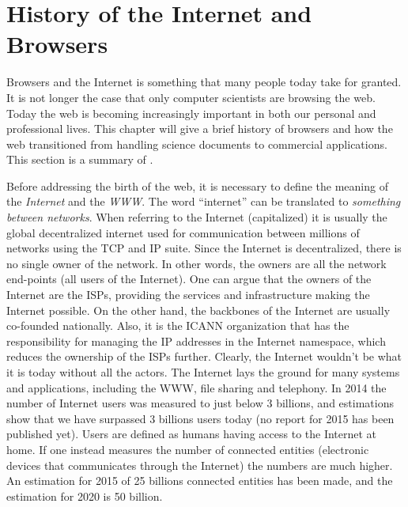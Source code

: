\chapter{History of the Internet and Browsers}
  Browsers and the Internet is something that many people today take for granted.
  It is not longer the case that only computer scientists are browsing the \gls{web}.
  Today the \gls{web} is becoming increasingly important in both our personal and professional lives.
  This chapter will give a brief history of \glspl{browser} and how the \gls{web} transitioned from handling science \glspl{document} to commercial applications.
  This section is a summary of .


  Before addressing the birth of the \gls{web}, it is necessary to define the meaning of the \emph{Internet} and the \emph{\gls{WWW}}.
  The word ``internet'' can be translated to \emph{something between networks}.
  When referring to the Internet (capitalized) it is usually the global decentralized internet used for communication between millions of networks using the \gls{TCP} and \gls{IP} suite.
  Since the Internet is decentralized, there is no single owner of the network.
  In other words, the owners are all the network end-points (all users of the Internet).
  One can argue that the owners of the Internet are the \glspl{ISP}, providing the services and infrastructure making the Internet possible.
  On the other hand, the backbones of the Internet are usually co-founded nationally.
  Also, it is the \gls{ICANN} organization that has the responsibility for managing the \gls{IP} addresses in the Internet namespace, which reduces the ownership of the \glspl{ISP} further.
  Clearly, the Internet wouldn't be what it is today without all the actors.
  The Internet lays the ground for many systems and applications, including the \gls{WWW}, file sharing and telephony.
  In 2014 the number of Internet users was measured to just below 3 billions, and estimations show that we have surpassed 3 billions users today (no report for 2015 has been published yet).
  Users are defined as humans having access to the Internet at home.
  If one instead measures the number of connected entities (electronic devices that communicates through the Internet) the numbers are much higher.
  An estimation for 2015 of 25 billions connected entities has been made, and the estimation for 2020 is 50 billion.
  
